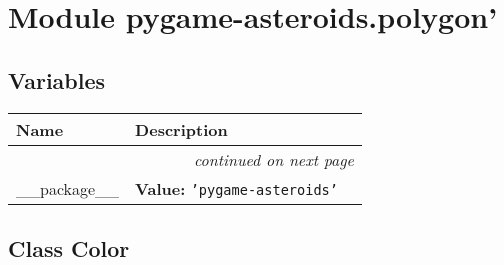 %
%
%


\section{Module pygame-asteroids.polygon'}

    \label{pygame-asteroids:polygon'}


  \subsection{Variables}

    \vspace{-1cm}
\hspace{\varindent}\begin{longtable}{|p{\varnamewidth}|p{\vardescrwidth}|l}
\cline{1-2}
\cline{1-2} \centering \textbf{Name} & \centering \textbf{Description}& \\
\cline{1-2}
\endhead\cline{1-2}\multicolumn{3}{r}{\small\textit{continued on next page}}\\\endfoot\cline{1-2}
\endlastfoot\raggedright \_\-\_\-p\-a\-c\-k\-a\-g\-e\-\_\-\_\- & \raggedright \textbf{Value:} 
{\tt \texttt{'}\texttt{pygame-asteroids}\texttt{'}}&\\
\cline{1-2}
\end{longtable}



\subsection{Class Color}

